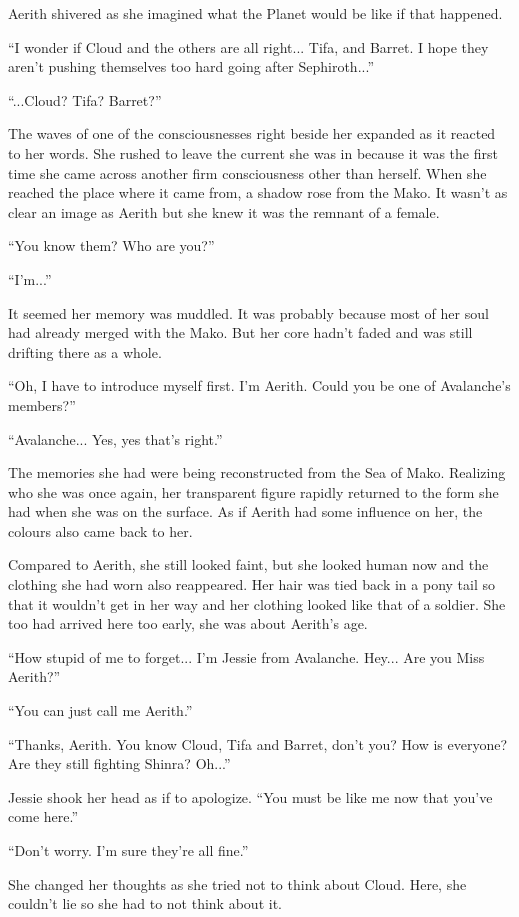 \documentclass[oneside]{book}
\begin{document}
Aerith shivered as she imagined what the Planet would be like if that happened.

“I wonder if Cloud and the others are all right... Tifa, and Barret. I hope they aren't pushing themselves too hard going after Sephiroth...”

“...Cloud? Tifa? Barret?”

The waves of one of the consciousnesses right beside her expanded as it reacted to her words. She rushed to leave the current she was in because it was the first time she came across another firm consciousness other than herself. When she reached the place where it came from, a shadow rose from the Mako. It wasn't as clear an image as Aerith but she knew it was the remnant of a female.

“You know them? Who are you?”

“I'm...”

It seemed her memory was muddled. It was probably because most of her soul had already merged with the Mako. But her core hadn't faded and was still drifting there as a whole.

“Oh, I have to introduce myself first. I'm Aerith. Could you be one of Avalanche's members?”

“Avalanche... Yes, yes that's right.”

The memories she had were being reconstructed from the Sea of Mako. Realizing who she was once again, her transparent figure rapidly returned to the form she had when she was on the surface. As if Aerith had some influence on her, the colours also came back to her.

Compared to Aerith, she still looked faint, but she looked human now and the clothing she had worn also reappeared. Her hair was tied back in a pony tail so that it wouldn't get in her way and her clothing looked like that of a soldier. She too had arrived here too early, she was about Aerith's age.

“How stupid of me to forget... I'm Jessie from Avalanche. Hey... Are you Miss Aerith?”

“You can just call me Aerith.”

“Thanks, Aerith. You know Cloud, Tifa and Barret, don't you? How is everyone? Are they still fighting Shinra? Oh...”

Jessie shook her head as if to apologize. “You must be like me now that you've come here.”

“Don't worry. I'm sure they're all fine.”

She changed her thoughts as she tried not to think about Cloud. Here, she couldn't lie so she had to not think about it.
\end{document}
